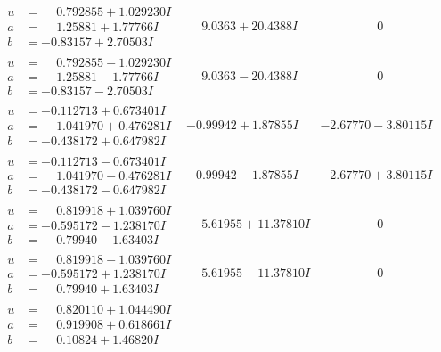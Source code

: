 \documentclass[1p]{elsarticle_modified}
\theoremstyle{definition}
\begin{document}
$$\begin{array}{c|c|c}
\begin{aligned}
u &= \phantom{-}0.792855 + 1.029230 I \\
a &= \phantom{-}1.25881 + 1.77766 I \\
b &= -0.83157 + 2.70503 I\end{aligned}
 & \phantom{-}9.0363 + 20.4388 I & \phantom{-0.000000 } 0 \\ \hline\begin{aligned}
u &= \phantom{-}0.792855 - 1.029230 I \\
a &= \phantom{-}1.25881 - 1.77766 I \\
b &= -0.83157 - 2.70503 I\end{aligned}
 & \phantom{-}9.0363 - 20.4388 I & \phantom{-0.000000 } 0 \\ \hline\begin{aligned}
u &= -0.112713 + 0.673401 I \\
a &= \phantom{-}1.041970 + 0.476281 I \\
b &= -0.438172 + 0.647982 I\end{aligned}
 & -0.99942 + 1.87855 I & -2.67770 - 3.80115 I \\ \hline\begin{aligned}
u &= -0.112713 - 0.673401 I \\
a &= \phantom{-}1.041970 - 0.476281 I \\
b &= -0.438172 - 0.647982 I\end{aligned}
 & -0.99942 - 1.87855 I & -2.67770 + 3.80115 I \\ \hline\begin{aligned}
u &= \phantom{-}0.819918 + 1.039760 I \\
a &= -0.595172 - 1.238170 I \\
b &= \phantom{-}0.79940 - 1.63403 I\end{aligned}
 & \phantom{-}5.61955 + 11.37810 I & \phantom{-0.000000 } 0 \\ \hline\begin{aligned}
u &= \phantom{-}0.819918 - 1.039760 I \\
a &= -0.595172 + 1.238170 I \\
b &= \phantom{-}0.79940 + 1.63403 I\end{aligned}
 & \phantom{-}5.61955 - 11.37810 I & \phantom{-0.000000 } 0 \\ \hline\begin{aligned}
u &= \phantom{-}0.820110 + 1.044490 I \\
a &= \phantom{-}0.919908 + 0.618661 I \\
b &= \phantom{-}0.10824 + 1.46820 I\end{aligned}

\end{array}$$
\end{document}
